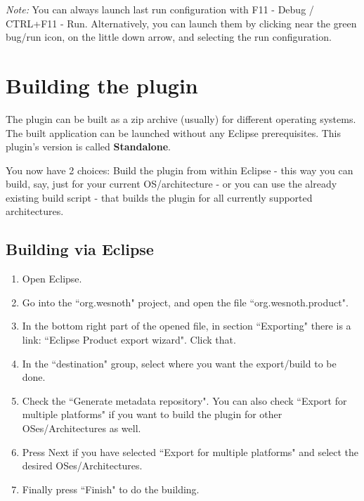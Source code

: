 \documentclass[10pt]{article}
\begin{document}
\textit{Note:} You can always launch last run configuration with F11 - Debug / CTRL+F11 - Run. Alternatively, you can launch them by clicking near the green bug/run icon, on the little down arrow, and selecting the run configuration.

\section{Building the plugin}
The plugin can be built as a zip archive (usually) for different operating systems. The built application can be launched without any Eclipse prerequisites. This plugin's version is called \textbf{Standalone}.

You now have 2 choices: Build the plugin from within Eclipse - this way you can build, say, just for your current OS/architecture - or you can use the already existing build script - that builds the plugin for all currently supported architectures.

\subsection{Building via Eclipse}
\begin{enumerate}
    \item Open Eclipse.
    \item Go into the ``org.wesnoth" project, and open the file ``org.wesnoth.product".
    \item In the bottom right part of the opened file, in section ``Exporting" there is a link: ``Eclipse Product export wizard". Click that.
    \item In the ``destination" group, select where you want the export/build to be done.
    \item Check the ``Generate metadata repository". You can also check ``Export for multiple platforms" if you want to build the plugin for other OSes/Architectures as well.
    \item Press Next if you have selected ``Export for multiple platforms" and select the desired OSes/Architectures.
    \item Finally press ``Finish" to do the building.
\end{enumerate}
\end{document}
